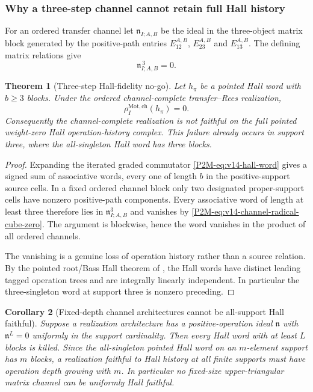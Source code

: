 \documentclass[11pt]{article}
\newtheorem{theorem}{Theorem}[section]
\newtheorem{corollary}[theorem]{Corollary}
\theoremstyle{remark}
\newcommand{\Mot}{\mathrm{Mot}}
\begin{document}
\subsubsection{Why a three-step channel cannot retain full Hall history}

For an ordered transfer channel let $\mathfrak n_{I;A,B}$ be the ideal in the
three-object matrix block generated by the positive-path entries
$E_{12}^{A,B}$, $E_{23}^{A,B}$ and $E_{13}^{A,B}$.  The defining matrix
relations give
\begin{equation}\label{P2M-eq:v14-channel-radical-cube-zero}
 \boxed{\mathfrak n_{I;A,B}^{\,3}=0.}
\end{equation}

\begin{theorem}[Three-step Hall-fidelity no-go]
\label{P2M-thm:v14-three-step-hall-nogo}
Let $h_\pi$ be a pointed Hall word with $b\ge3$ blocks.  Under the ordered
channel-complete transfer--Rees realization,
\begin{equation}
 \boxed{\rho_I^{\Mot,\mathrm{ch}}(h_\pi)=0.}
\end{equation}
Consequently the channel-complete realization is not faithful on the full
pointed weight-zero Hall operation-history complex.  This failure already occurs in
support three, where the all-singleton Hall word has three blocks.
\end{theorem}

\begin{proof}
Expanding the iterated graded commutator \eqref{P2M-eq:v14-hall-word} gives a signed
sum of associative words, every one of length $b$ in the positive-support
source cells.  In a fixed ordered channel block only two designated
proper-support cells have nonzero positive-path components.  Every associative
word of length at least three therefore lies in
$\mathfrak n_{I;A,B}^{3}$ and vanishes by
\eqref{P2M-eq:v14-channel-radical-cube-zero}.  The argument is blockwise, hence the
word vanishes in the product of all ordered channels.

The vanishing is a genuine loss of operation history rather than a source
relation.  By the pointed root/Bass Hall theorem of
, the Hall words have distinct leading tagged
operation trees and are integrally linearly independent.  In particular the
three-singleton word at support three is nonzero preceding.
\end{proof}

\begin{corollary}[Fixed-depth channel architectures cannot be all-support Hall faithful]
\label{P2M-cor:v14-fixed-depth-hall-nogo}
Suppose a realization architecture has a positive-operation ideal $\mathfrak n$
with $\mathfrak n^L=0$ uniformly in the support cardinality.  Then every Hall
word with at least $L$ blocks is killed.  Since the all-singleton pointed Hall
word on an $m$-element support has $m$ blocks, a realization faithful to Hall
history at all finite supports must have operation depth growing with $m$.
In particular no fixed-size upper-triangular matrix channel can be uniformly
Hall faithful.
\end{corollary}
\end{document}
